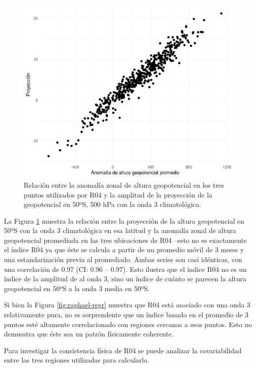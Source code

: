 \documentclass[12pt,oneside]{reedthesis}
\begin{document}
\begin{figure}
\includegraphics{figures/15-onda3/pseudo-raphael-1} \caption{Relación entre la anomalía zonal de altura geopotencial en los tres puntos utilizados por R04 y la amplitud de la proyección de la geopotencial en 50ºS, 500 hPa con la onda 3 climatológica.}\label{fig:pseudo-raphael}
\end{figure}



La Figura \ref{fig:pseudo-raphael} muestra la relación entre la proyección de la altura geopotencial en 50ºS con la onda 3 climatológica en esa latitud y la anomalía zonal de altura geopotencial promediada en las tres ubicaciones de R04 --esto no es exactamente el índice R04 ya que éste se calcula a partir de un promedio móvil de 3 meses y una estandarización previa al promediado.
Ambas series son casi idénticas, con una correlación de 0.97 (CI: 0.96 -- 0.97).
Esto ilustra que el índice R04 no es un índice de la amplitud de al onda 3, sino un índice de cuánto se parecen la altura geopotencial en 50ºS a la onda 3 media en 50ºS.

Si bien la Figura \ref{fig:raphael-regr} muestra que R04 está asociado con una onda 3 relativamente pura, no es sorprendente que un índice basado en el promedio de 3 puntos esté altamente correlacionado con regiones cercanas a esos puntos.
Esto no demuestra que éste sea un patrón físicamente coherente.

Para investigar la consistencia física de R04 se puede analizar la covariabilidad entre las tres regiones utilizadas para calcularlo.
\end{document}
